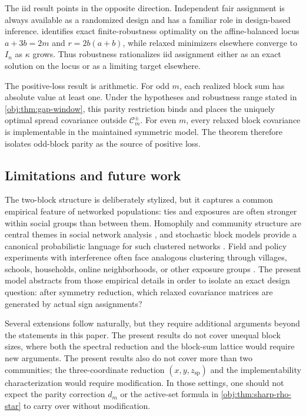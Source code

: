 The iid result points in the opposite direction. Independent fair assignment is always available as a randomized design and has a familiar role in design-based inference.  identifies exact finite-robustness optimality on the affine-balanced locus \(a+3b=2m\) and \(r=2b(a+b)\), while relaxed minimizers elsewhere converge to \(I_n\) as \(\kappa\) grows. Thus robustness rationalizes iid assignment either as an exact solution on the locus or as a limiting target elsewhere.

The positive-loss result is arithmetic. For odd \(m\), each realized block sum has absolute value at least one. Under the hypotheses and robustness range stated in \cref{obj:thm:gap-window}, this parity restriction binds and places the uniquely optimal spread covariance outside \(\mathcal C_m^{\pm}\). For even \(m\), every relaxed block covariance is implementable in the maintained symmetric model. The theorem therefore isolates odd-block parity as the source of positive loss.

\subsection{Limitations and future work}

The two-block structure is deliberately stylized, but it captures a common empirical feature of networked populations: ties and exposures are often stronger within social groups than between them. Homophily and community structure are central themes in social network analysis \citep{mcpherson2001,newman2002}, and stochastic block models provide a canonical probabilistic language for such clustered networks \citep{holland1983,abbe2017}. Field and policy experiments with interference often face analogous clustering through villages, schools, households, online neighborhoods, or other exposure groups \citep{banerjee2013,baird2018,ugander2020,li2021}. The present model abstracts from those empirical details in order to isolate an exact design question: after symmetry reduction, which relaxed covariance matrices are generated by actual sign assignments?

Several extensions follow naturally, but they require additional arguments beyond the statements in this paper. The present results do not cover unequal block sizes, where both the spectral reduction and the block-sum lattice would require new arguments. The present results also do not cover more than two communities; the three-coordinate reduction \((x,y,z_{\mathrm{sp}})\) and the implementability characterization would require modification. In those settings, one should not expect the parity correction \(d_m\) or the active-set formula in \cref{obj:thm:sharp-rho-star} to carry over without modification.

